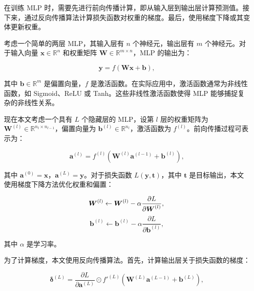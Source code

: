 在训练 MLP 时，需要先进行前向传播计算，即从输入层到输出层计算预测值。接下来，通过反向传播算法计算损失函数对权重的梯度。最后，使用梯度下降或其变体更新权重。

考虑一个简单的两层 MLP，其输入层有 $n$ 个神经元，输出层有 $m$ 个神经元。对于输入向量 $\boldsymbol{x} \in \mathbb{R}^{n}$ 和权重矩阵 $\boldsymbol{W} \in \mathbb{R}^{m \times n}$，MLP 的输出为：

\begin{equation}
\boldsymbol{y} = f(\boldsymbol{W}\boldsymbol{x} + \boldsymbol{b}),
\end{equation}

其中 $\boldsymbol{b} \in \mathbb{R}^{m}$ 是偏置向量，$f$ 是激活函数。在实际应用中，激活函数通常为非线性函数，如 Sigmoid、ReLU 或 Tanh。这些非线性激活函数使得 MLP 能够捕捉复杂的非线性关系。

现在本文考虑一个具有 $L$ 个隐藏层的 MLP，设第 $l$ 层的权重矩阵为 $\boldsymbol{W}^{(l)} \in \mathbb{R}^{n_l \times n_{l-1}}$，偏置向量为 $\boldsymbol{b}^{(l)} \in \mathbb{R}^{n_l}$，激活函数为 $f^{(l)}$。前向传播过程可表示为：

\begin{equation}
\boldsymbol{a}^{(l)} = f^{(l)}(\boldsymbol{W}^{(l)}\boldsymbol{a}^{(l-1)} + \boldsymbol{b}^{(l)}),
\end{equation}

其中 $\boldsymbol{a}^{(0)} = \boldsymbol{x}$，$\boldsymbol{a}^{(L)} = \boldsymbol{y}$。对于损失函数 $L(\boldsymbol{y}, \boldsymbol{t})$，其中 $\boldsymbol{t}$ 是目标输出，本文使用梯度下降方法优化权重和偏置：

\begin{equation}
\boldsymbol{W}^{(l)} \leftarrow \boldsymbol{W}^{(l)} - \alpha \frac{\partial L}{\partial \boldsymbol{W}^{(l)}}, \\
\end{equation}
\begin{equation}
\boldsymbol{b}^{(l)} \leftarrow \boldsymbol{b}^{(l)} - \alpha \frac{\partial L}{\partial \boldsymbol{b}^{(l)}},
\end{equation}

其中 $\alpha$ 是学习率。

为了计算梯度，本文使用反向传播算法。首先，计算输出层关于损失函数的梯度：

\begin{equation}
\boldsymbol{\delta}^{(L)} = \frac{\partial L}{\partial \boldsymbol{a}^{(L)}} \odot f'^{(L)}(\boldsymbol{W}^{(L)}\boldsymbol{a}^{(L-1)} + \boldsymbol{b}^{(L)}),
\end{equation}


